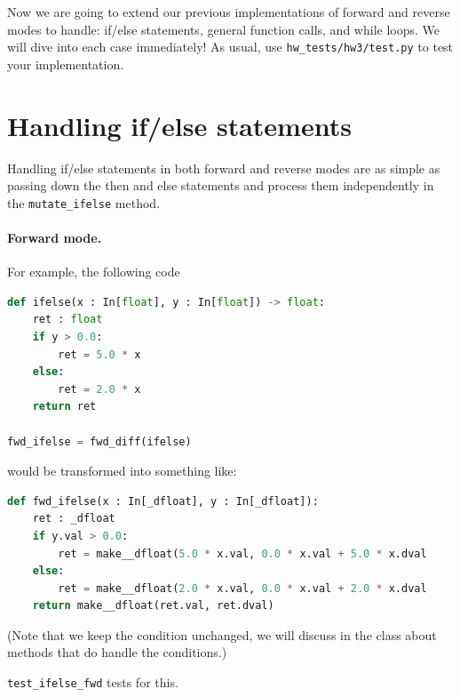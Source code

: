 




Now we are going to extend our previous implementations of forward and reverse modes to handle: if/else statements, general function calls, and while loops. We will dive into each case immediately! As usual, use \lstinline{hw_tests/hw3/test.py} to test your implementation.

\section{Handling if/else statements}

Handling if/else statements in both forward and reverse modes are as simple as passing down the then and else statements and process them independently in the \lstinline{mutate_ifelse} method. 

\paragraph{Forward mode.} For example, the following code
\begin{lstlisting}[language=Python]
def ifelse(x : In[float], y : In[float]) -> float:
    ret : float
    if y > 0.0:
        ret = 5.0 * x
    else:
        ret = 2.0 * x
    return ret

fwd_ifelse = fwd_diff(ifelse)
\end{lstlisting}
would be transformed into something like:
\begin{lstlisting}[language=Python]
def fwd_ifelse(x : In[_dfloat], y : In[_dfloat]):
    ret : _dfloat
    if y.val > 0.0:
        ret = make__dfloat(5.0 * x.val, 0.0 * x.val + 5.0 * x.dval
    else:
        ret = make__dfloat(2.0 * x.val, 0.0 * x.val + 2.0 * x.dval
    return make__dfloat(ret.val, ret.dval)
\end{lstlisting}
(Note that we keep the condition unchanged, we will discuss in the class about methods that do handle the conditions.)

\lstinline{test_ifelse_fwd} tests for this.

